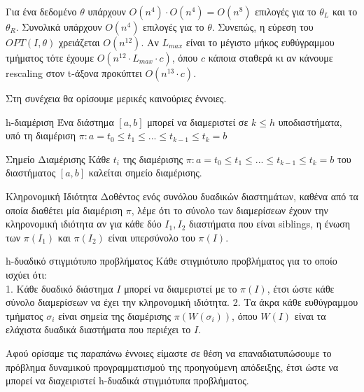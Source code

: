 \documentclass[oneside,12pt]{book}
\theoremstyle{definition}
\begin{document}
Για ένα δεδομένο \(θ\) υπάρχουν \(O(n^4) \cdot O(n^4) = O(n^8)\) επιλογές για το \(θ_L\) και το \(θ_R\). Συνολικά υπάρχουν \(O(n^4)\) επιλογές για το \(θ\). Συνεπώς, η εύρεση του \(OPT(I,θ)\) χρειάζεται \(Ο(n^{12})\). Αν \(L_{max}\) είναι το μέγιστο μήκος ευθύγραμμου τμήματος τότε έχουμε \(Ο(n^{12} \cdot L_{max} \cdot c)\), όπου \(c\) κάποια σταθερά κι αν κάνουμε rescaling στον t-άξονα προκύπτει \(Ο(n^{13} \cdot c)\).

Στη συνέχεια θα ορίσουμε μερικές καινούριες έννοιες. \\

\begin{mydefinition}{h-διαμέριση}{}
	Ένα διάστημα \([a,b]\) μπορεί να διαμεριστεί σε \(k \leq h\) υποδιαστήματα, υπό τη διαμέριση \(π: a = t_0 \leq t_1 \leq ... \leq t_{k-1} \leq t_k = b\)
\end{mydefinition}

\begin{mydefinition}{Σημείο Διαμέρισης}{}
	Κάθε \(t_i\) της διαμέρισης \(π: a = t_0 \leq t_1 \leq ... \leq t_{k-1} \leq t_k = b\) του διαστήματος \([a,b]\) καλείται σημείο διαμέρισης.
\end{mydefinition}

\begin{mydefinition}{Κληρονομική Ιδιότητα}{}
	Δοθέντος ενός συνόλου δυαδικών διαστημάτων, καθένα από τα οποία διαθέτει μία διαμέριση \(π\), λέμε ότι το σύνολο των διαμερίσεων έχουν την κληρονομική ιδιότητα αν για κάθε δύο \(I_1, I_2\) διαστήματα που είναι siblings, η ένωση των \(π(I_1)\) και \(π(I_2)\) είναι υπερσύνολο του \(π(Ι)\).
\end{mydefinition}

\begin{mydefinition}{h-δυαδικό στιγμιότυπο προβλήματος}{}
	Κάθε στιγμιότυπο προβλήματος για το οποίο ισχύει ότι: \\
	1. Κάθε δυαδικό διάστημα \(I\) μπορεί να διαμεριστεί με το \(π(Ι)\), έτσι ώστε κάθε σύνολο διαμερίσεων να έχει την κληρονομική ιδιότητα.
	2. Τα άκρα κάθε ευθύγραμμου τμήματος \(σ_i\) είναι σημεία της διαμέρισης \(π(W(σ_i))\), όπου \(W(I)\) είναι τα ελάχιστα δυαδικά διαστήματα που περιέχει το \(I\).
\end{mydefinition}

Αφού ορίσαμε τις παραπάνω έννοιες είμαστε σε θέση να επαναδιατυπώσουμε το πρόβλημα δυναμικού προγραμματισμού της προηγούμενη απόδειξης, έτσι ώστε να μπορεί να διαχειριστεί h-δυαδικά στιγμιότυπα προβλήματος. \\
\end{document}
